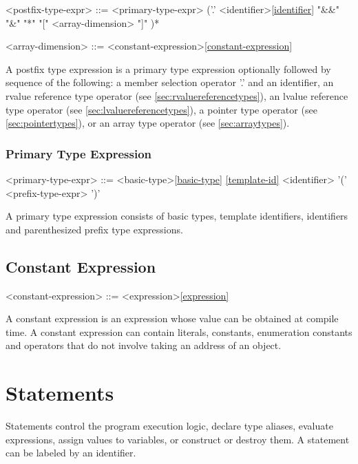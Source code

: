 \documentclass[a4paper,oneside,11pt]{article}
\begin{document}
\begin{grammar}
<postfix-type-expr> ::= <primary-type-expr> ('.' <identifier>\ref{identifier}
\alt "&&"
\alt "&"
\alt "*"
\alt "[" <array-dimension> "]"
)*

<array-dimension> ::= <constant-expression>\ref{constant-expression}
\end{grammar}

A postfix type expression is a primary type expression optionally followed by sequence of the
following:
a member selection operator '.' and an identifier, an rvalue reference type operator (see \ref{sec:rvaluereferencetypes}),
an lvalue reference type operator (see \ref{sec:lvaluereferencetypes}), a pointer type operator (see \ref{sec:pointertypes}),
or an array type operator (see \ref{sec:arraytypes}).

\subsubsection{Primary Type Expression}

\begin{grammar}
<primary-type-expr> ::= <basic-type>\ref{basic-type}
\ref{template-id}
\alt <identifier>
\alt '(' <prefix-type-expr> ')'
\end{grammar}

A primary type expression consists of basic types, template identifiers, identifiers and parenthesized
prefix type expressions.

\subsection{Constant Expression}

\begin{grammar}
\label{constant-expression}<constant-expression> ::= <expression>\ref{expression}
\end{grammar}

A constant expression is an expression whose value can be obtained at compile time.
A constant expression can contain literals, constants, enumeration constants and operators that
do not involve taking an address of an object.

\section{Statements}

Statements control the program execution logic, declare type aliases, evaluate expressions,
assign values to variables, or construct or destroy them.
A statement can be labeled by an identifier.
\end{document}
